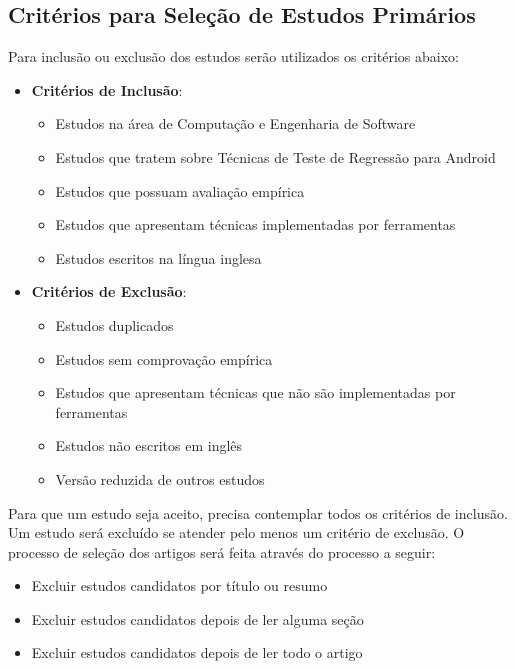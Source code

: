 \subsection{Critérios para Seleção de Estudos Primários}

Para inclusão ou exclusão dos estudos serão utilizados os critérios abaixo:

\begin{itemize}
    \item \textbf{Critérios de Inclusão}: 
    \begin{itemize}
        \item Estudos na área de Computação e Engenharia de Software
        \item Estudos que tratem sobre Técnicas de Teste de Regressão para Android
        \item Estudos que possuam avaliação empírica
        \item Estudos que apresentam técnicas implementadas por ferramentas
        \item Estudos escritos na língua inglesa
    \end{itemize} 

    \item \textbf{Critérios de Exclusão}: 
    \begin{itemize}
        \item Estudos duplicados
        \item Estudos sem comprovação empírica
        \item Estudos que apresentam técnicas que não são implementadas por ferramentas
        \item Estudos não escritos em inglês
        \item Versão reduzida de outros estudos
    \end{itemize}
\end{itemize}


Para que um estudo seja aceito, precisa contemplar todos os critérios de inclusão. Um estudo será excluído se atender pelo menos um critério de exclusão. O processo de seleção dos artigos será feita através do processo a seguir:

\begin{itemize}
    \item Excluir estudos candidatos por título ou resumo
    \item Excluir estudos candidatos depois de ler alguma seção
    \item Excluir estudos candidatos depois de ler todo o artigo
\end{itemize}


